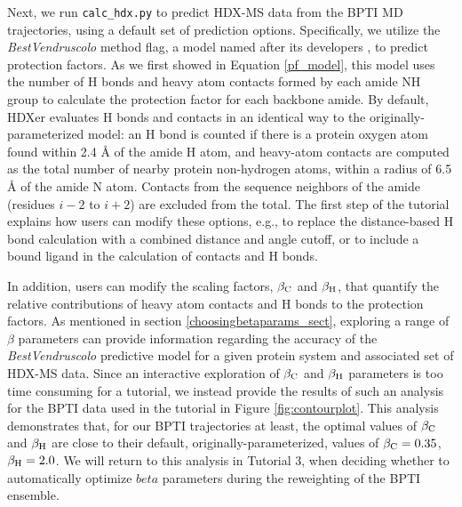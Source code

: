 \documentclass[9pt,tutorial]{livecoms}
\begin{document}
Next, we run \texttt{calc\_hdx.py} to predict HDX-MS data from the BPTI MD trajectories, using a default set of prediction options.
Specifically, we utilize the \textit{BestVendruscolo} method flag, a model named after its developers \cite{BestVendruscolo2006}, to predict protection factors.
As we first showed in Equation \ref{pf_model}, this model uses the number of H bonds and heavy atom contacts formed by each amide NH group to calculate the protection factor for each backbone amide.
By default, HDXer evaluates H bonds and contacts in an identical way to the originally-parameterized model: an H bond is counted if there is a protein oxygen atom found within 2.4 Å of the amide H atom, and heavy-atom contacts are computed as the total number of nearby protein non-hydrogen atoms, within a radius of 6.5 Å of the amide N atom.
Contacts from the sequence neighbors of the amide (residues $i-2$ to $i+2$) are excluded from the total.
The first step of the tutorial explains how users can modify these options, e.g., to replace the distance-based H bond calculation with a combined distance and angle cutoff, or to include a bound ligand in the calculation of contacts and H bonds. 

In addition, users can modify the scaling factors, $\beta_\textnormal{C}$ and $\beta_\textnormal{H}$, that quantify the relative contributions of heavy atom contacts and H bonds to the protection factors.
As mentioned in section \ref{choosingbetaparams_sect}, exploring a range of $\beta$ parameters can provide information regarding the accuracy of the \textit{BestVendruscolo} predictive model for a given protein system and associated set of HDX-MS data.
Since an interactive exploration of $\beta_\textnormal{C}$ and $\beta_\textnormal{H}$ parameters is too time consuming for a tutorial, we instead provide the results of such an analysis for the BPTI data used in the tutorial in Figure \ref{fig:contourplot}.
This analysis demonstrates that, for our BPTI trajectories at least, the optimal values of $\beta_\textnormal{C}$ and $\beta_\textnormal{H}$ are close to their default, originally-parameterized, values of $\beta_\textnormal{C} = 0.35$, $\beta_\textnormal{H} = 2.0$.
We will return to this analysis in Tutorial 3, when deciding whether to automatically optimize $beta$ parameters during the reweighting of the BPTI ensemble.
\end{document}
